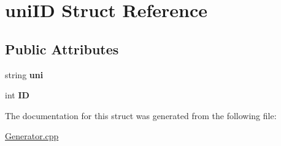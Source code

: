 \hypertarget{structuni_i_d}{\section{uni\-I\-D Struct Reference}
\label{structuni_i_d}
}
\subsection*{Public Attributes}
\begin{DoxyCompactItemize}
\item 
\hypertarget{structuni_i_d_af2dfac1baaf7e8edec25414f58548ba1}{string {\bfseries uni}}\label{structuni_i_d_af2dfac1baaf7e8edec25414f58548ba1}

\item 
\hypertarget{structuni_i_d_af29608512426fba1244c0a069c83ddb6}{int {\bfseries I\-D}}\label{structuni_i_d_af29608512426fba1244c0a069c83ddb6}

\end{DoxyCompactItemize}


The documentation for this struct was generated from the following file\-:\begin{DoxyCompactItemize}
\item 
\hyperlink{_generator_8cpp}{Generator.\-cpp}\end{DoxyCompactItemize}
